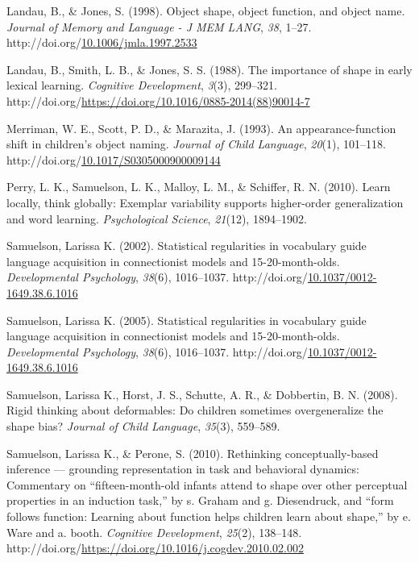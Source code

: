 \documentclass[10pt, letterpaper]{article}
\begin{document}
\begin{CSLReferences}{1}{0}
Landau, B., \& Jones, S. (1998). Object shape, object function, and
object name. \emph{Journal of Memory and Language - J MEM LANG},
\emph{38}, 1--27.
http://doi.org/\href{https://doi.org/10.1006/jmla.1997.2533}{10.1006/jmla.1997.2533}

Landau, B., Smith, L. B., \& Jones, S. S. (1988). The importance of
shape in early lexical learning. \emph{Cognitive Development},
\emph{3}(3), 299--321.
http://doi.org/\url{https://doi.org/10.1016/0885-2014(88)90014-7}

Merriman, W. E., Scott, P. D., \& Marazita, J. (1993). An
appearance-function shift in children's object naming. \emph{Journal of
Child Language}, \emph{20}(1), 101--118.
http://doi.org/\href{https://doi.org/10.1017/S0305000900009144}{10.1017/S0305000900009144}

Perry, L. K., Samuelson, L. K., Malloy, L. M., \& Schiffer, R. N.
(2010). Learn locally, think globally: Exemplar variability supports
higher-order generalization and word learning. \emph{Psychological
Science}, \emph{21}(12), 1894--1902.

Samuelson, Larissa K. (2002). Statistical regularities in vocabulary
guide language acquisition in connectionist models and 15-20-month-olds.
\emph{Developmental Psychology}, \emph{38}(6), 1016--1037.
http://doi.org/\href{https://doi.org/10.1037/0012-1649.38.6.1016}{10.1037/0012-1649.38.6.1016}

Samuelson, Larissa K. (2005). Statistical regularities in vocabulary
guide language acquisition in connectionist models and 15-20-month-olds.
\emph{Developmental Psychology}, \emph{38}(6), 1016--1037.
http://doi.org/\href{https://doi.org/10.1037/0012-1649.38.6.1016}{10.1037/0012-1649.38.6.1016}

Samuelson, Larissa K., Horst, J. S., Schutte, A. R., \& Dobbertin, B. N.
(2008). Rigid thinking about deformables: Do children sometimes
overgeneralize the shape bias? \emph{Journal of Child Language},
\emph{35}(3), 559--589.

Samuelson, Larissa K., \& Perone, S. (2010). Rethinking
conceptually-based inference --- grounding representation in task and
behavioral dynamics: Commentary on {``fifteen-month-old infants attend
to shape over other perceptual properties in an induction task,''} by s.
Graham and g. Diesendruck, and {``form follows function: Learning about
function helps children learn about shape,''} by e. Ware and a. booth.
\emph{Cognitive Development}, \emph{25}(2), 138--148.
http://doi.org/\url{https://doi.org/10.1016/j.cogdev.2010.02.002}


\end{CSLReferences}
\end{document}

